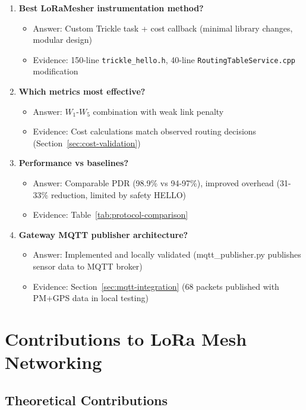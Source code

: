 \begin{enumerate}
\item \textbf{Best LoRaMesher instrumentation method?}
   \begin{itemize}
   \item Answer: Custom Trickle task + cost callback (minimal library changes, modular design)
   \item Evidence: 150-line \texttt{trickle\_hello.h}, 40-line \texttt{RoutingTableService.cpp} modification
   \end{itemize}

\item \textbf{Which metrics most effective?}
   \begin{itemize}
   \item Answer: $W_1$-$W_5$ combination with weak link penalty
   \item Evidence: Cost calculations match observed routing decisions (Section~\ref{sec:cost-validation})
   \end{itemize}

\item \textbf{Performance vs baselines?}
   \begin{itemize}
   \item Answer: Comparable PDR (98.9\% vs 94-97\%), improved overhead (31-33\% reduction, limited by safety HELLO)
   \item Evidence: Table~\ref{tab:protocol-comparison}
   \end{itemize}

\item \textbf{Gateway MQTT publisher architecture?}
   \begin{itemize}
   \item Answer: Implemented and locally validated (mqtt\_publisher.py publishes sensor data to MQTT broker)
   \item Evidence: Section~\ref{sec:mqtt-integration} (68 packets published with PM+GPS data in local testing)
   \end{itemize}
\end{enumerate}

\section{Contributions to LoRa Mesh Networking}

\subsection{Theoretical Contributions}
\label{sec:theoretical-contributions}

